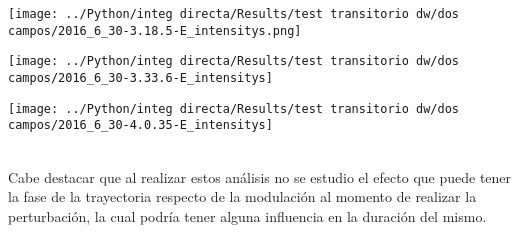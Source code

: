 			\begin{minipage}{0.33\textwidth}
				\centering
				\texttt{[image: ../Python/integ directa/Results/test transitorio dw/dos campos/2016\_6\_30-3.18.5-E\_intensitys.png]}
			\end{minipage}
			\begin{minipage}{0.33\textwidth}
				\centering
				\texttt{[image: ../Python/integ directa/Results/test transitorio dw/dos campos/2016\_6\_30-3.33.6-E\_intensitys]}
			\end{minipage}
			\begin{minipage}{0.33\textwidth}
				\centering
				\texttt{[image: ../Python/integ directa/Results/test transitorio dw/dos campos/2016\_6\_30-4.0.35-E\_intensitys]}
			\end{minipage}\\
				
	
		Cabe destacar que al realizar estos análisis no se estudio el efecto que puede tener la fase de la trayectoria respecto de la modulación al momento de realizar la perturbación, la cual podría tener alguna influencia en la duración del mismo.
